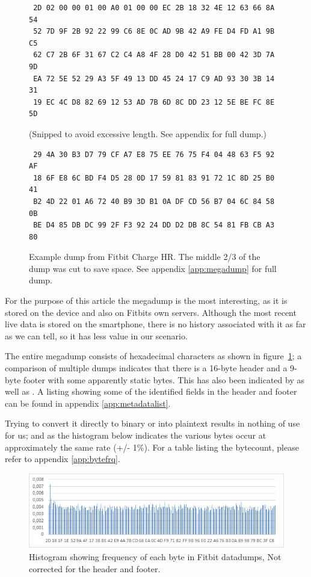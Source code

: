 \documentclass[a4paper,11pt,dvips]{article}
\begin{document}
\begin{figure}
\begin{verbatim}
 2D 02 00 00 01 00 A0 01 00 00 EC 2B 18 32 4E 12 63 66 8A 54
 52 7D 9F 2B 92 22 99 C6 8E 0C AD 9B 42 A9 FE D4 FD A1 9B C5
 62 C7 2B 6F 31 67 C2 C4 A8 4F 28 D0 42 51 BB 00 42 3D 7A 9D
 EA 72 5E 52 29 A3 5F 49 13 DD 45 24 17 C9 AD 93 30 3B 14 31
 19 EC 4C D8 82 69 12 53 AD 7B 6D 8C DD 23 12 5E BE FC 8E 5D
\end{verbatim}
(Snipped to avoid excessive length. See appendix for full dump.)
\begin{verbatim}
 29 4A 30 B3 D7 79 CF A7 E8 75 EE 76 75 F4 04 48 63 F5 92 AF
 18 6F E8 6C BD F4 D5 28 0D 17 59 81 83 91 72 1C 8D 25 B0 41
 B2 4D 22 01 A6 72 40 B9 3D B1 0A DF CD 56 B7 04 6C 84 58 0B
 BE D4 85 DB DC 99 2F F3 92 24 DD D2 DB 8C 54 81 FB CB A3 80
\end{verbatim}
\caption{Example dump from Fitbit Charge HR. The middle 2/3 of the dump was cut to save space. See appendix \ref{app:megadump} for full dump.}
\label{fig:megadump}
\end{figure}

For the purpose of this article the megadump is the most interesting, as it is stored on the device and also on Fitbits own servers. Although the most recent live data is stored on the smartphone, there is no history associated with it as far as we can tell, so it has less value in our scenario.

The entire megadump consists of hexadecimal characters as shown in figure~\ref{fig:megadump}; a comparison of multiple dumps indicates that there is a 16-byte header and a 9-byte footer with some apparently static bytes. This has also been indicated by \cite{Allard:2014a} as well as \cite{Aprville:2015b}. A listing showing some of the identified fields in the header and footer can be found in appendix \ref{app:metadatalist}.

Trying to convert it directly to binary or into plaintext results in nothing of use for us; and as the histogram below indicates the various bytes occur at approximately the same rate (+/- 1\%). For a table listing the bytecount, please refer to appendix \ref{app:bytefrq}.

\begin{figure}
\noindent
\includegraphics[natwidth=624bp,natheight=184bp,width=\linewidth]{histogram_meta}
\caption{Histogram showing frequency of each byte in Fitbit datadumps, Not corrected for the header and footer.}
\label{fig:histogram_meta}
\end{figure}
\end{document}
